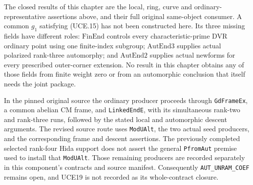The closed results of this chapter are the local, ring, curve and
ordinary-representative assertions above, and their full original
same-object consumer.  A common \(g_1\) satisfying (UCE.15) has
not been constructed here.  Its three missing fields have different
roles: \(\mathrm{FinEnd}\) controls every characteristic-prime DVR
ordinary point using one finite-index subgroup; \(\mathrm{AutEnd3}\)
supplies actual polarized rank-three automorphy; and
\(\mathrm{AutEnd2}\) supplies actual newforms for every prescribed
outer-corner extension.  No result in this chapter obtains any of
those fields from finite weight zero or from an automorphic conclusion
that itself needs the joint package.

In the pinned original source the ordinary producer proceeds through
\texttt{GdFrameEx}, a common abelian CM frame, and
\texttt{LinkedEndE}, with its simultaneous rank-two and rank-three
runs, followed by the stated local and automorphic descent arguments.
The revised source route uses \texttt{ModUAlt}, the two actual seed
producers, and the corresponding frame and descent assertions.
The previously completed selected rank-four Hida support does not
assert the general \texttt{PfromAut} premise used to install that
\texttt{ModUAlt}.  Those remaining producers are recorded separately
in this component's contracts and source manifest.  Consequently
\texttt{AUT\_UNRAM\_COEF} remains open, and UCE19 is not recorded as
its whole-contract closure.
